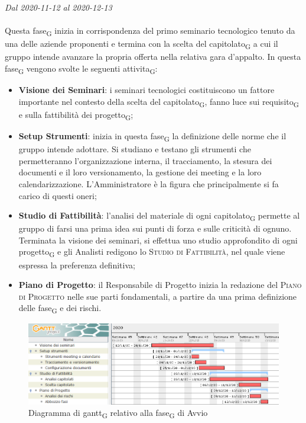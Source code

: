 \textit{Dal 2020-11-12 al 2020-12-13}
\\\\
Questa fase\textsubscript{G} inizia in corrispondenza del primo seminario tecnologico tenuto da una delle aziende proponenti e termina con la scelta del capitolato\textsubscript{G} a cui il gruppo intende avanzare la propria offerta nella relativa gara d'appalto.
In questa fase\textsubscript{G} vengono svolte le seguenti attivita\textsubscript{G}:
\begin{itemize}
	\item \textbf{Visione dei Seminari}: i seminari tecnologici costituiscono un fattore importante nel contesto della scelta del capitolato\textsubscript{G}, fanno luce sui requisito\textsubscript{G} e sulla fattibilità dei progetto\textsubscript{G};
	\item \textbf{Setup Strumenti}: inizia in questa fase\textsubscript{G} la definizione delle norme che il gruppo intende adottare. Si studiano e testano gli strumenti che permetteranno l'organizzazione interna, il tracciamento, la stesura dei documenti e il loro versionamento, la gestione dei meeting e la loro calendarizzazione. L'Amministratore è la figura che principalmente si fa carico di questi oneri;
	\item \textbf{Studio di Fattibilità}: l'analisi del materiale di ogni capitolato\textsubscript{G} permette al gruppo di farsi una prima idea sui punti di forza e sulle criticità di ognuno. Terminata la visione dei seminari, si effettua uno studio approfondito di ogni progetto\textsubscript{G} e gli Analisti redigono lo \textsc{Studio di Fattibilità}, nel quale viene espressa la preferenza definitiva;
	\item \textbf{Piano di Progetto}: il Responsabile di Progetto inizia la redazione del \textsc{Piano di Progetto} nelle sue parti fondamentali, a partire da una prima definizione delle fase\textsubscript{G} e dei rischi.
\end{itemize}  


\begin{figure}[H]
	\centering
	\includegraphics[scale=0.62]{res/images/01_gantt_avvio.png}
	\caption{Diagramma di gantt\textsubscript{G} relativo alla fase\textsubscript{G} di Avvio}
\end{figure}





